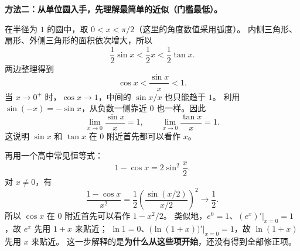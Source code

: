 \clearpage
\begin{proofbox}
\textbf{方法二：从单位圆入手，先理解最简单的近似（门槛最低）。}

在半径为 $1$ 的圆中，取 $0<x<\pi/2$（这里的角度数值采用弧度）。
内侧三角形、扇形、外侧三角形的面积依次增大，所以
\[
 \frac12\sin x<\frac12x<\frac12\tan x.
\]
两边整理得到
\[
 \cos x<\frac{\sin x}{x}<1.
\]
当 $x\to0^+$ 时，$\cos x\to1$，中间的 $\sin x/x$ 也只能趋于 $1$。
利用 $\sin(-x)=-\sin x$，从负数一侧靠近 $0$ 也一样。因此
\[
 \boxed{\lim_{x\to0}\frac{\sin x}{x}=1},\qquad
 \boxed{\lim_{x\to0}\frac{\tan x}{x}=1}.
\]
这说明 $\sin x$ 和 $\tan x$ 在 $0$ 附近首先都可以看作 $x$。

再用一个高中常见恒等式：
\[
 1-\cos x=2\sin^2\frac x2.
\]
对 $x\ne0$，有
\[
 \frac{1-\cos x}{x^2}
 =\frac12\left(\frac{\sin(x/2)}{x/2}\right)^2
 \longrightarrow\frac12.
\]
所以 $\cos x$ 在 $0$ 附近首先可以看作 $1-x^2/2$。
类似地，$e^0=1$、$(e^x)'|_{x=0}=1$，故 $e^x$ 先用 $1+x$ 来贴近；
$\ln1=0$、$\bigl(\ln(1+x)\bigr)'|_{x=0}=1$，故 $\ln(1+x)$ 先用 $x$ 来贴近。
这一步解释的是\textbf{为什么从这些项开始}，还没有得到全部修正项。

\medskip
\end{proofbox}
\clearpage
